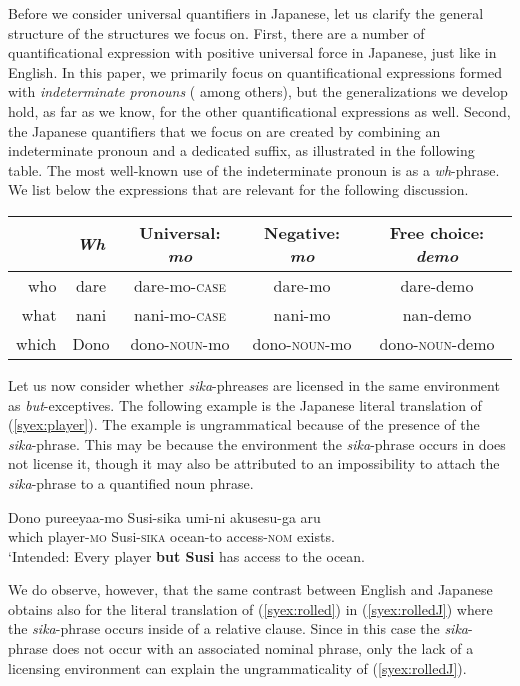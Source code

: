 \documentclass[output=paper,colorlinks,citecolor=brown,
]{langscibook}
\def\M#1{\textsc{#1}}
\begin{document}
Before we consider universal quantifiers in Japanese, let us clarify the general structure of the structures we focus on.
First, there are a number of quantificational expression with positive universal force in Japanese, just like in English.
In this paper, we primarily focus on quantificational expressions formed with \emph{indeterminate pronouns}  (\citealt{nishigauchi90, shimoyama06, yatsushiro09b} among others), but the generalizations we develop hold, as far as we know, for the other quantificational expressions as well.
Second, the Japanese quantifiers that we focus on are created by combining an indeterminate pronoun and a dedicated suffix, as  illustrated in the following table.
The most well-known use of the indeterminate pronoun is as a \emph{wh}-phrase. 
We list below the expressions that are relevant for the following discussion.

\begin{center}
  \begin{tabular}{rcccc}
  {} & \emph{Wh} & Universal: \textit{mo} & Negative: \textit{mo} & Free choice: \textit{demo}\\\toprule
  who & dare & dare-mo-\M{case} & dare-mo & dare-demo\\
  what & nani & nani-mo-\M{case} & nani-mo & nan-demo\\
  which & Dono & dono-\M{noun}-mo & dono-\M{noun}-mo & dono-\M{noun}-demo\\
  \end{tabular}
\end{center}

Let us now consider whether \emph{sika}-phreases are licensed in the same environment as \emph{but}-exceptives.
The following example is the Japanese literal translation of (\ref{syex:player}).  The example is ungrammatical because of the presence of the  \emph{sika}-phrase.  This may be because the environment the \emph{sika}-phrase occurs in does not license it, though it may also be attributed to an impossibility to attach the \emph{sika}-phrase to a quantified noun phrase.

\ea \gll *Dono pureeyaa-mo Susi-sika umi-ni akusesu-ga aru\\
which player-\M{mo} Susi-\M{sika} ocean-to access-\M{nom} exists.\\
\glt `Intended: Every player \textbf{but Susi} has access to the ocean.\z

We do observe, however, that the same contrast between English and Japanese obtains also for the literal translation of (\ref{syex:rolled}) in (\ref{syex:rolledJ}) where the \emph{sika}-phrase occurs inside of a relative clause.
Since in this case the \emph{sika}-phrase does not occur with an associated nominal phrase, only the lack of a licensing environment can explain the ungrammaticality of (\ref{syex:rolledJ}).
\end{document}

